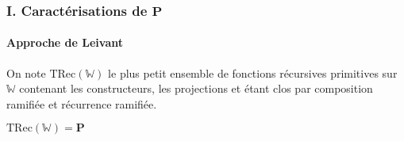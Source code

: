 \documentclass[10pt]{beamer}
\newcommand{\bbW}{\mathbb{W}}
\newcommand{\TRec}[1]{\text{TRec}\left(\mathbb{#1}\right)}
\newcommand{\TRecd}[1]{\text{TRec}_{2}\left(\mathbb{#1}\right)}
\begin{document}
%				
%				
%	
%	
	\begin{frame}
		\frametitle{I. Caractérisations de $\textbf{P}$}
		\framesubtitle{Approche de Leivant}
		
		\begin{defn}
			On note $\TRec{W}$ le plus petit ensemble de fonctions récursives primitives sur $\bbW$ contenant les constructeurs, les projections et étant clos par composition ramifiée et récurrence ramifiée.
			
		\end{defn}
		
		\pause
		
		\begin{thm}
			$\TRec{W} = \textbf{P}$ %
		\end{thm}
	\end{frame}
\end{document}
